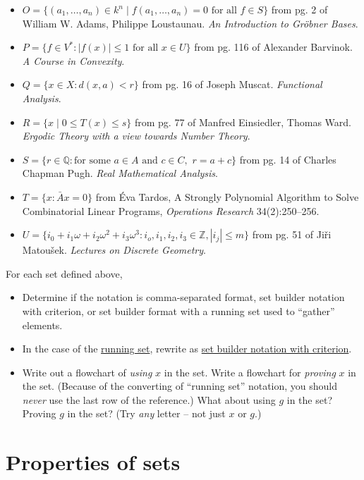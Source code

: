 \documentclass{book}
\theoremstyle{ekimcustom}
\begin{document}
\begin{itemize}
\item $O = \{(a_1,\dots,a_n) \in k^n \mid f(a_1,\dots,a_n)=0 \text{ for all } f \in S\}$ from pg. 2 of William W. Adams, Philippe Loustaunau. \emph{An Introduction to Gr\"obner Bases}.
\item $P = \{f \in V^* : |f(x)|\leq 1 \text{ for all } x \in U\}$ from pg. 116 of Alexander Barvinok. \emph{A Course in Convexity}.
\item $Q = \{x \in X : d(x,a) < r\}$ from pg. 16 of Joseph Muscat. \emph{Functional Analysis}.
\item $R = \{x \mid 0 \leq T(x) \leq s\}$ from pg. 77 of Manfred Einsiedler, Thomas Ward. \emph{Ergodic Theory with a view towards Number Theory}.
\item $S = \{r \in \mathbb{Q} : \text{for some } a \in A \text{ and } c \in C,\,\, r= a+c\}$ from pg. 14 of Charles Chapman Pugh. \emph{Real Mathematical Analysis}.
\item $T = \{x : \bar{A}x=0\}$ from \'Eva Tardos, A Strongly Polynomial Algorithm to Solve Combinatorial Linear Programs, \emph{Operations Research} 34(2):250--256.
\item $U = \{i_0 + i_1 \omega + i_2 \omega^2+i_3\omega^3 : i_o,i_1,i_2,i_3 \in \mathbb{Z}, |i_j|\leq m\}$ from pg. 51 of Ji\v{r}i Matou\v{s}ek. \emph{Lectures on Discrete Geometry}.
\end{itemize}
For each set defined above,
\begin{itemize}
\item Determine if the notation is comma-separated format, set builder notation with criterion, or set builder format with a running set used to ``gather'' elements.
\item In the case of the \underline{running set}, rewrite as \underline{set builder notation with criterion}.
\item Write out a flowchart of \emph{using} $x$ in the set. Write a flowchart for \emph{proving} $x$ in the set. (Because of the converting of ``running set'' notation, you should \emph{never} use the last row of the reference.) What about using $g$ in the set? Proving $g$ in the set? (Try \emph{any} letter -- not just $x$ or $g$.)
\end{itemize}

\section{Properties of sets}
\end{document}
